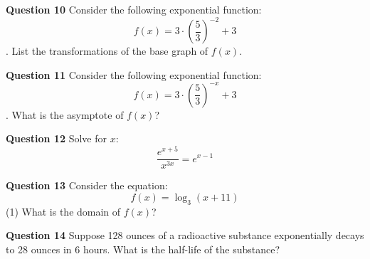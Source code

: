 \documentclass{beamer}
\begin{document}
%	

\begin{frame}{\textbf{Question 10}}
	Consider the following exponential function: \[f(x)=3 \cdot \left(\frac{5}{3}\right)^{-2}+3\]. List the transformations of the base graph of $f(x)$.
	\bigskip
	
\end{frame}

\begin{frame}{\textbf{Question 11}}
	Consider the following exponential function: \[f(x)=3 \cdot \left(\frac{5}{3}\right)^{-x}+3\]. What is the asymptote of $f(x)$?
	\bigskip
	
\end{frame}

\begin{frame}{\textbf{Question 12}}
	Solve for $x$: \[\frac{e^{x+5}}{x^{3x}}=e^{x-1}\]
	\bigskip
	
\end{frame}

\begin{frame}{\textbf{Question 13}}
	Consider the equation: \[f(x)=\log_3(x+11)\] (1) What is the domain of $f(x)$?
	\bigskip
	
\end{frame}

\begin{frame}{\textbf{Question 14}}
	Suppose 128 ounces of a radioactive substance exponentially decays to 28 ounces in 6 hours. What is the half-life of the substance?
	\bigskip
	
\end{frame}
\end{document}
